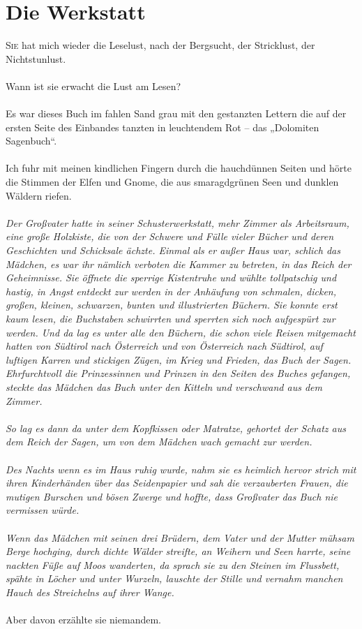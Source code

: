 \chapter{Die Werkstatt}
\lettrine{S}{ie} hat mich wieder die Leselust, nach der Bergsucht, der Stricklust, der Nichtstunlust.\\\\
Wann ist sie erwacht die Lust am Lesen?\\\\
Es war dieses Buch im fahlen Sand grau mit den gestanzten Lettern die auf der ersten Seite des Einbandes tanzten in leuchtendem Rot – das „Dolomiten Sagenbuch“.\\\\
Ich fuhr mit meinen kindlichen Fingern durch die hauchdünnen Seiten und hörte die Stimmen der Elfen und Gnome, die aus smaragdgrünen Seen und dunklen Wäldern riefen.\\\\
\textit{Der Großvater hatte in seiner Schusterwerkstatt, mehr Zimmer als Arbeitsraum, eine große Holzkiste, die von der Schwere und Fülle vieler Bücher und deren Geschichten und Schicksale ächzte. Einmal als er außer Haus war, schlich das Mädchen, es war ihr nämlich verboten die Kammer zu betreten, in das Reich der Geheimnisse. Sie öffnete die sperrige Kistentruhe und wühlte tollpatschig und hastig, in Angst entdeckt zur werden in der Anhäufung von schmalen, dicken, großen, kleinen, schwarzen, bunten und illustrierten Büchern. Sie konnte erst kaum lesen, die Buchstaben schwirrten und sperrten sich noch aufgespürt zur werden. Und da lag es unter alle den Büchern, die schon viele Reisen mitgemacht hatten von Südtirol nach Österreich und von Österreich nach Südtirol, auf luftigen Karren und stickigen Zügen, im Krieg und Frieden, das Buch der Sagen. Ehrfurchtvoll die Prinzessinnen und Prinzen in den Seiten des Buches gefangen, steckte das Mädchen das Buch unter den Kitteln und verschwand aus dem Zimmer. \\\\
So lag es dann da unter dem Kopfkissen oder Matratze, gehortet der Schatz aus dem Reich der Sagen, um von dem Mädchen wach gemacht zur werden. \\\\
Des Nachts wenn es im Haus ruhig wurde, nahm sie es heimlich hervor strich mit ihren Kinderhänden über das Seidenpapier und sah die verzauberten Frauen, die mutigen Burschen und bösen Zwerge und hoffte, dass Großvater das Buch nie vermissen würde.\\\\
Wenn das Mädchen mit seinen drei Brüdern, dem Vater und der Mutter mühsam Berge hochging, durch dichte Wälder streifte, an Weihern und Seen harrte, seine nackten Füße auf Moos wanderten, da sprach sie zu den Steinen im Flussbett, spähte in Löcher und unter Wurzeln, lauschte der Stille und vernahm manchen Hauch des Streichelns auf ihrer Wange.} \\\\
Aber davon erzählte sie niemandem. 
